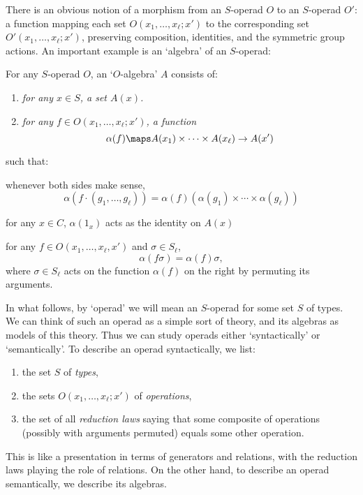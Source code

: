 There is an obvious notion of a morphism from an $S$-operad $O$ to an
$S$-operad $O'$: a function mapping each set $O(x_1,\dots,x_\ell;x')$ to
the corresponding set $O'(x_1,\dots,x_\ell;x')$, preserving composition,
identities, and the symmetric group actions.  An important example is an
`algebra' of an $S$-operad:

\begin{defn}  \label{c.op.algebras}\et  For any $S$-operad
$O$, an `$O$-algebra' $A$ consists of:
{\rm \begin{enumerate}
\item {\it for any $x \in S$, a set $A(x)$.}
\item {\it for any $f \in O(x_1,\dots,x_\ell;x')$, a function
\[   \alpha(f) \maps A(x_1) \times \cdots \times A(x_\ell) \to A(x') \]  }
\end{enumerate}}
\noindent such that:
\begin{alphalist}
\item whenever both sides make sense,
\[      \alpha(f \cdot (g_1, \dots, g_\ell)) = \alpha(f) (\alpha(g_1)
\times \cdots \times \alpha(g_\ell)) \]
\item  for any $x \in C$, $\alpha(1_x)$ acts as the
identity on $A(x)$
\item for any $f \in O(x_1,\dots,x_\ell,x')$ and $\sigma \in S_\ell$,
\[         \alpha(f\sigma) = \alpha(f)\sigma, \]
where $\sigma \in S_\ell$ acts on the function $\alpha(f)$ 
on the right by permuting its arguments. 
\end{alphalist}
\end{defn}

In what follows, by `operad' we will mean an $S$-operad for some set $S$
of types.  We can think of such an operad as a simple sort of theory,
and its algebras as models of this theory.   Thus we can study operads
either `syntactically' or `semantically'.  To describe an operad
syntactically, we list: 
\begin{enumerate} 
\item the set $S$ of {\it types}, 
\item the sets $O(x_1,\dots,x_\ell;x')$ of {\it operations}, 
\item the set of all {\it reduction laws} saying that some composite of
operations (possibly with arguments permuted) equals some other
operation.   
\end{enumerate} 
This is like a presentation in terms of generators and relations, with
the reduction laws playing the role of relations.  On the other hand, to
describe an operad semantically, we describe its algebras.  

